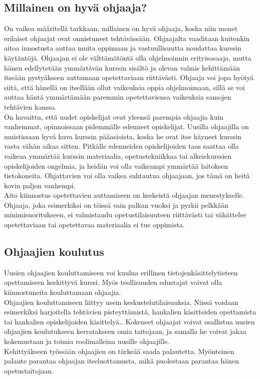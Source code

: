 \documentclass[finnish]{tktltiki2}
\theoremstyle{definition}
\theoremstyle{remark}
\begin{document}
\subsection{Millainen on hyvä ohjaaja?}
On vaikea määritellä tarkkaan, millainen on hyvä ohjaaja, koska niin monet erilaiset ohjaajat ovat onnistuneet tehtävässään. Ohjaajalta vaaditaan kuitenkin aitoa innostusta auttaa muita oppimaan ja vastuullisuutta noudattaa kurssin käytäntöjä. Ohjaajan ei ole välttämätöntä olla ohjelmoinnin erityisosaaja, mutta hänen edellytetään ymmärtävän kurssin sisältö ja olevan valmis kehittämään itseään pystyäkseen auttamaan opetettaviaan riittävästi.\cite{Reges88} Ohjaaja voi jopa hyötyä siitä, että hänellä on itsellään ollut vaikeuksia oppia ohjelmoimaan, sillä se voi auttaa häntä ymmärtämään paremmin opetettaviensa vaikeuksia samojen tehtävien kanssa.\cite{Decker06}
\\
On havaittu, että uudet opiskelijat ovat yleensä parempia ohjaajia kuin vanhemmat, opinnoissaan pidemmälle edenneet opiskelijat. Uusilla ohjaajilla on muistissaan hyvä kuva kurssin pääasioista, koska he ovat itse käyneet kurssin vasta vähän aikaa sitten.\cite{Dickson11} Pitkälle edenneiden opiskelijoiden taas saattaa olla vaikeaa ymmärtää kurssin materiaalia, opetustekniikkaa tai alkeiskurssien opiskelijoiden ongelmia, ja heidän voi olla vaikeampi ymmärtää laitoksen tietokoneita.\cite{Reges88} Ohjattavien voi olla vaikea suhtautua ohjaajaan, jos tämä on heitä kovin paljon vanhempi.\cite{Decker06}
\\
Aito kiinnostus opetettavien auttamiseen on keskeistä ohjaajan menestykselle. Ohjaaja, joka esimerkiksi on töissä vain palkan vuoksi ja pyrkii pelkkään minimisuoritukseen, ei valmistaudu opetustilaisuuteen riittävästi tai vähättelee opetettaviaan tai opetettavaa materiaalia ei tue oppimista.\cite{Richards00}


\subsection{Ohjaajien koulutus}

Uusien ohjaajien kouluttamiseen voi kuulua erillinen tietojenkäsittelytieteen opettamiseen keskittyvä kurssi.\cite{Reges88, Roberts95} Myös teollisuuden edustajat voivat olla kiinnostuneita kouluttamaan ohjaajia.\cite{Morgan02}
\\
Ohjaajien kouluttamiseen liittyy usein keskustelutilaisuuksia. Niissä voidaan esimerkiksi harjoitella tehtävien pisteyttämistä, hankalien käsitteiden opettamista tai hankalien opiskelijoiden käsittelyä.\cite{Reges03}. Kokeneet ohjaajat voivat osallistua uusien ohjaajien koulutukseen kerratakseen omia taitojaan, ja samalla he voivat jakaa kokemustaan ja toimia roolimalleina uusille ohjaajille.\cite{Reges88} 
\\
Kehittyäkseen työssään ohjaajien on tärkeää saada palautetta.\cite{Patitsas12} Myönteinen palaute parantaa ohjaajan itseluottamusta, mikä puolestaan parantaa hänen opetustaitojaan.
\end{document}
